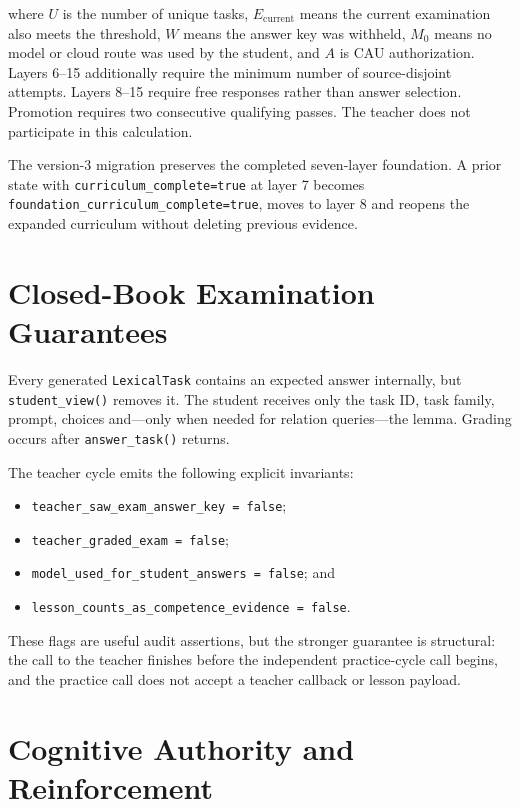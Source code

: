 \documentclass[11pt,a4paper]{article}
\begin{document}
where $U$ is the number of unique tasks, $E_{\mathrm{current}}$ means the current examination
also meets the threshold, $W$ means the answer key was withheld, $M_0$ means no model or cloud
route was used by the student, and $A$ is CAU authorization. Layers 6--15 additionally require
the minimum number of source-disjoint attempts. Layers 8--15 require free responses rather
than answer selection. Promotion requires two consecutive qualifying passes. The teacher does
not participate in this calculation.

The version-3 migration preserves the completed seven-layer foundation. A prior state with
\texttt{curriculum\_complete=true} at layer 7 becomes
\texttt{foundation\_curriculum\_complete=true}, moves to layer 8 and reopens the expanded
curriculum without deleting previous evidence.

\section{Closed-Book Examination Guarantees}

Every generated \texttt{LexicalTask} contains an expected answer internally, but
\texttt{student\_view()} removes it. The student receives only the task ID, task family,
prompt, choices and---only when needed for relation queries---the lemma. Grading occurs after
\texttt{answer\_task()} returns.

The teacher cycle emits the following explicit invariants:

\begin{itemize}
  \item \texttt{teacher\_saw\_exam\_answer\_key = false};
  \item \texttt{teacher\_graded\_exam = false};
  \item \texttt{model\_used\_for\_student\_answers = false}; and
  \item \texttt{lesson\_counts\_as\_competence\_evidence = false}.
\end{itemize}

These flags are useful audit assertions, but the stronger guarantee is structural: the call to
the teacher finishes before the independent practice-cycle call begins, and the practice call
does not accept a teacher callback or lesson payload.

\section{Cognitive Authority and Reinforcement}
\end{document}
